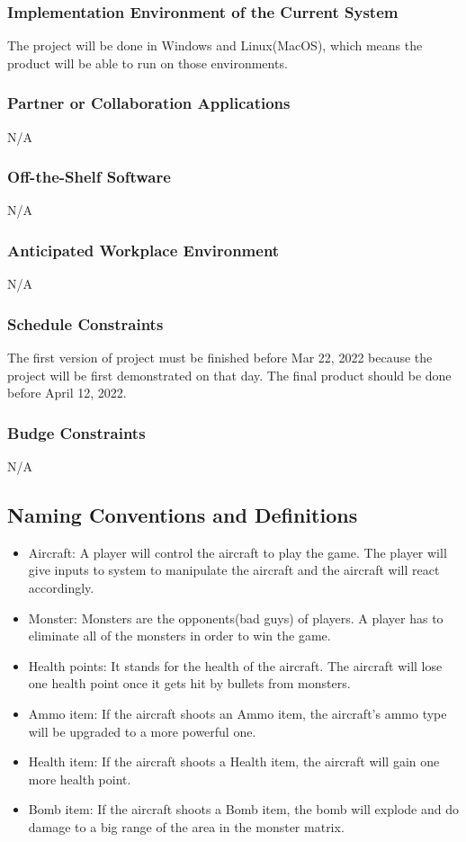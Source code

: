 \documentclass[12pt]{article}
\begin{document}
\subsubsection{Implementation Environment of the Current System}
The project will be done in Windows and Linux(MacOS), which means the product will be able to run on those environments.
\subsubsection{Partner or Collaboration Applications}
N/A
\subsubsection{Off-the-Shelf Software}
N/A
\subsubsection{Anticipated Workplace Environment}
N/A
\subsubsection{Schedule Constraints}
The first version of project must be finished before Mar 22, 2022 because the project will be first demonstrated on that day. The final product should be done before April 12, 2022.
\subsubsection{Budge Constraints}
N/A
\subsection{Naming Conventions and Definitions}
\begin{itemize}
\item Aircraft: A player will control the aircraft to play the game. The player will give inputs to system to manipulate the aircraft and the aircraft will react accordingly.
\item Monster: Monsters are the opponents(bad guys) of players. A player has to eliminate all of the monsters 
in order to win the game.
\item Health points: It stands for the health of the aircraft. The aircraft will lose one health point once it gets hit
by bullets from monsters.
\item Ammo item: If the aircraft shoots an Ammo item, the aircraft’s ammo type will be upgraded to a more powerful one.
\item Health item: If the aircraft shoots a Health item, the aircraft will gain one more health point.
\item Bomb item: If the aircraft shoots a Bomb item, the bomb will explode and do damage to a big range of the area in the
monster matrix.
\end{itemize}
\end{document}
